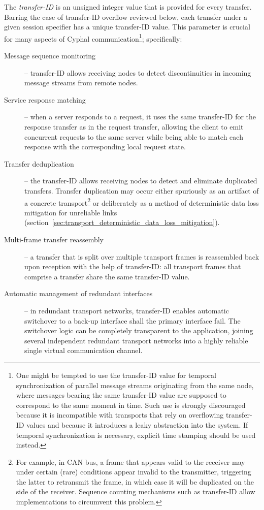 The \emph{transfer-ID} is an unsigned integer value that is provided for every transfer.
Barring the case of transfer-ID overflow reviewed below,
each transfer under a given session specifier has a unique transfer-ID value.
This parameter is crucial for many aspects of Cyphal communication\footnote{%
    One might be tempted to use the transfer-ID value for temporal synchronization of
    parallel message streams originating from the same node,
    where messages bearing the same transfer-ID value are supposed to correspond to the same moment in time.
    Such use is strongly discouraged because it is incompatible with transports that rely on overflowing
    transfer-ID values and because it introduces a leaky abstraction into the system.
    If temporal synchronization is necessary, explicit time stamping should be used instead.
}; specifically:

\begin{description}
    \item[Message sequence monitoring] -- transfer-ID allows receiving nodes to detect discontinuities
    in incoming message streams from remote nodes.

    \item[Service response matching] -- when a server responds to a request, it uses the same transfer-ID for the
    response transfer as in the request transfer,
    allowing the client to emit concurrent requests to the same server while being able to
    match each response with the corresponding local request state.

    \item[Transfer deduplication] -- the transfer-ID allows receiving nodes to detect and eliminate duplicated
    transfers.
    Transfer duplication may occur either spuriously as an artifact of a concrete transport\footnote{%
        For example, in CAN bus, a frame that appears valid to the receiver may under certain (rare) conditions
        appear invalid to the transmitter, triggering the latter to retransmit the frame,
        in which case it will be duplicated on the side of the receiver.
        Sequence counting mechanisms such as transfer-ID allow implementations to circumvent this problem.
    } or deliberately as a method of deterministic data loss mitigation for unreliable links
    (section~\ref{sec:transport_deterministic_data_loss_mitigation}).

    \item[Multi-frame transfer reassembly] -- a transfer that is split over multiple transport frames is reassembled
    back upon reception with the help of transfer-ID: all transport frames that comprise a transfer
    share the same transfer-ID value.

    \item[Automatic management of redundant interfaces] -- in redundant transport networks,
    transfer-ID enables automatic switchover to a back-up interface shall the primary interface fail.
    The switchover logic can be completely transparent to the application, joining several independent
    redundant transport networks into a highly reliable single virtual communication channel.
\end{description}

